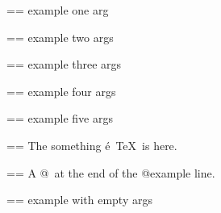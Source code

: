 \documentclass{book}
\makeatletter
\newenvironment{Texinfopreformatted}{%
  \par\GNUTobeylines\obeyspaces\frenchspacing\parskip=\z@\parindent=\z@}{}
{\catcode`\^^M=13 \gdef\GNUTobeylines{\catcode`\^^M=13 \def^^M{\null\par}}}
\newenvironment{Texinfoindented}{\begin{list}{}{}\item\relax}{\end{list}}
\renewcommand{\_}{\Texinfounderscore\discretionary{}{}{}}
\makeatother
\begin{document}
\begin{Texinfoindented}
\begin{Texinfopreformatted}%
\ttfamily example one arg
\end{Texinfopreformatted}
\end{Texinfoindented}

\begin{Texinfoindented}
\begin{Texinfopreformatted}%
\ttfamily example two args
\end{Texinfopreformatted}
\end{Texinfoindented}

\begin{Texinfoindented}
\begin{Texinfopreformatted}%
\ttfamily example three args
\end{Texinfopreformatted}
\end{Texinfoindented}

\begin{Texinfoindented}
\begin{Texinfopreformatted}%
\ttfamily example four args
\end{Texinfopreformatted}
\end{Texinfoindented}

\begin{Texinfoindented}
\begin{Texinfopreformatted}%
\ttfamily example five args
\end{Texinfopreformatted}
\end{Texinfoindented}

\begin{Texinfoindented}
\begin{Texinfopreformatted}%
\ttfamily The something \'{e}\ \TeX{}\ is here.
\end{Texinfopreformatted}
\end{Texinfoindented}

\begin{Texinfoindented}
\begin{Texinfopreformatted}%
\ttfamily A @\ at the end of the @example line.
\end{Texinfopreformatted}
\end{Texinfoindented}

\begin{Texinfoindented}
\begin{Texinfopreformatted}%
\ttfamily example with empty args
\end{Texinfopreformatted}
\end{Texinfoindented}
\end{document}
